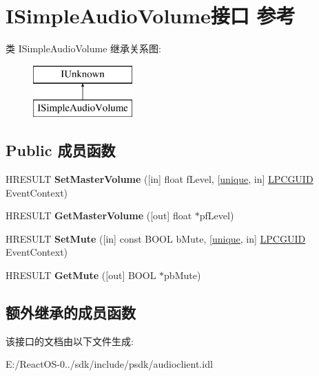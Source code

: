 \hypertarget{interface_i_simple_audio_volume}{}\section{I\+Simple\+Audio\+Volume接口 参考}
\label{interface_i_simple_audio_volume}
类 I\+Simple\+Audio\+Volume 继承关系图\+:\begin{figure}[H]
\begin{center}
\leavevmode
\includegraphics[height=2.000000cm]{interface_i_simple_audio_volume}
\end{center}
\end{figure}
\subsection*{Public 成员函数}
\begin{DoxyCompactItemize}
\item 
\mbox{\label{interface_i_simple_audio_volume_af9411c394f5a010f59e83445bb7e5d5f}} 
H\+R\+E\+S\+U\+LT {\bfseries Set\+Master\+Volume} (\mbox{[}in\mbox{]} float f\+Level, \mbox{[}\hyperlink{interfaceunique}{unique}, in\mbox{]} \hyperlink{interface_g_u_i_d}{L\+P\+C\+G\+U\+ID} Event\+Context)
\item 
\mbox{\label{interface_i_simple_audio_volume_a873643e1c995684e9df91dbb4126650a}} 
H\+R\+E\+S\+U\+LT {\bfseries Get\+Master\+Volume} (\mbox{[}out\mbox{]} float $\ast$pf\+Level)
\item 
\mbox{\label{interface_i_simple_audio_volume_aa4b979ae87958b303ada4b3d6ede4792}} 
H\+R\+E\+S\+U\+LT {\bfseries Set\+Mute} (\mbox{[}in\mbox{]} const B\+O\+OL b\+Mute, \mbox{[}\hyperlink{interfaceunique}{unique}, in\mbox{]} \hyperlink{interface_g_u_i_d}{L\+P\+C\+G\+U\+ID} Event\+Context)
\item 
\mbox{\label{interface_i_simple_audio_volume_a776295d63fd3d76e1b3ffb52e705ba31}} 
H\+R\+E\+S\+U\+LT {\bfseries Get\+Mute} (\mbox{[}out\mbox{]} B\+O\+OL $\ast$pb\+Mute)
\end{DoxyCompactItemize}
\subsection*{额外继承的成员函数}


该接口的文档由以下文件生成\+:\begin{DoxyCompactItemize}
\item 
E\+:/\+React\+O\+S-\/0../sdk/include/psdk/audioclient.\+idl\end{DoxyCompactItemize}

